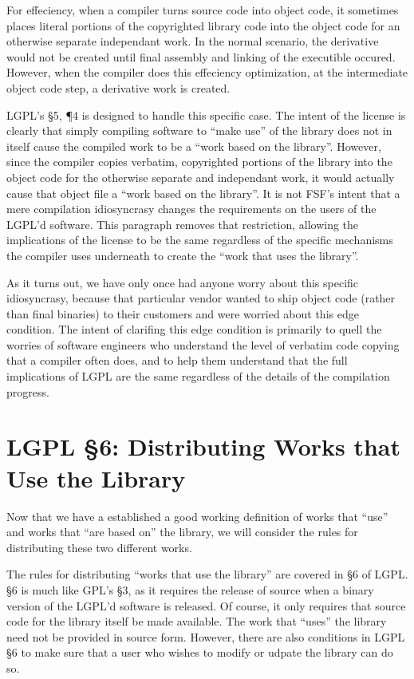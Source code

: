 \documentclass[12pt]{report}
\begin{document}
For effeciency, when a compiler turns source code into object code, it
sometimes places literal portions of the copyrighted library code into the
object code for an otherwise separate independant work.  In the normal
scenario, the derivative would not be created until final assembly and
linking of the executible occured.  However, when the compiler does this
effeciency optimization, at the intermediate object code step, a
derivative work is created.

LGPL's \S 5, \P 4 is designed to handle this specific case.  The intent of
the license is clearly that simply compiling software to ``make use'' of
the library does not in itself cause the compiled work to be a ``work
based on the library''.  However, since the compiler copies verbatim,
copyrighted portions of the library into the object code for the otherwise
separate and independant work, it would actually cause that object file a
``work based on the library''.  It is not FSF's intent that a mere
compilation idiosyncrasy changes the requirements on the users of the
LGPL'd software.  This paragraph removes that restriction, allowing the
implications of the license to be the same regardless of the specific
mechanisms the compiler uses underneath to create the ``work that uses the
library''.

As it turns out, we have only once had anyone worry about this specific
idiosyncrasy, because that particular vendor wanted to ship object code
(rather than final binaries) to their customers and were worried about
this edge condition.  The intent of clarifing this edge condition is
primarily to quell the worries of software engineers who understand the
level of verbatim code copying that a compiler often does, and to help
them understand that the full implications of LGPL are the same regardless
of the details of the compilation progress.

\section{LGPL \S 6: Distributing Works that Use the Library}

Now that we have a established a good working definition of works that
``use'' and works that ``are based on'' the library, we will consider the
rules for distributing these two different works.

The rules for distributing ``works that use the library'' are covered in
\S 6 of LGPL\@.  \S 6 is much like GPL's \S 3, as it requires the release
of source when a binary version of the LGPL'd software is released.  Of
course, it only requires that source code for the library itself be made
available.  The work that ``uses'' the library need not be provided in
source form.  However, there are also conditions in LGPL \S 6 to make sure
that a user who wishes to modify or udpate the library can do so.
\end{document}
